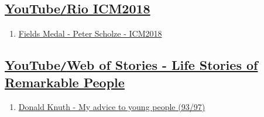 \documentclass{article}
\begin{document}

\subsection{\href{https://www.youtube.com/channel/UCnMLdlOoLICBNcEzjMLOc7w}{YouTube{\tt/}Rio ICM2018}}
\begin{enumerate}
	\item \href{https://www.youtube.com/watch?v=yEVlCZTqht8}{Fields Medal - Peter Scholze - ICM2018}
\end{enumerate}


\subsection{\href{https://www.youtube.com/channel/UCrN1lcGgsCB9axGjZjpOqiQ}{YouTube{\tt/}Web of Stories - Life Stories of Remarkable People}}
\begin{enumerate}
	\item \href{https://www.youtube.com/watch?v=75Ju0eM5T2c}{Donald Knuth - My advice to young people (93/97)}
\end{enumerate}
\end{document}
